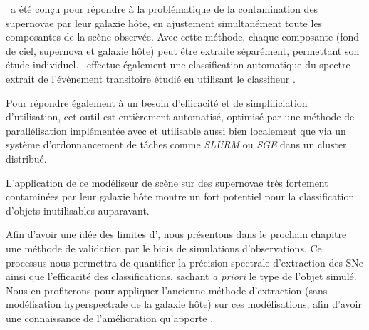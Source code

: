 \documentclass[../main/main.tex]{subfiles}
\begin{document}
\hypergal\ a été conçu pour répondre à la problématique de la
contamination des supernovae par leur galaxie hôte, en ajustement
simultanément toute les composantes de la scène observée. Avec cette
méthode, chaque composante (fond de ciel, supernova et galaxie hôte)
peut être extraite séparément, permettant son étude
individuel. \hypergal\ effectue également une classification automatique du
spectre extrait de l'évènement transitoire étudié en utilisant le
classifieur . 

Pour répondre également à un besoin d'efficacité et de simplificiation
d'utilisation, cet outil est entièrement
automatisé, optimisé par une méthode de parallélisation implémentée
avec  et utilisable aussi bien localement que via un système
d'ordonnancement de tâches comme \textit{SLURM} ou \textit{SGE} dans un
cluster distribué. 

L'application de ce modéliseur de scène sur des supernovae très
fortement contaminées par leur galaxie hôte montre un fort potentiel
pour la classification d'objets inutilisables auparavant.

Afin d'avoir une idée des limites d'\hypergal, nous présentons dans le
prochain chapitre une méthode de validation par le biais de simulations
d'observations. Ce processus nous permettra de quantifier la précision
spectrale d'extraction des SNe ainsi que l'efficacité des
classifications, sachant \textit{a priori} le type de l'objet
simulé. Nous en profiterons pour appliquer l'ancienne méthode
d'extraction (sans modélisation hyperspectrale de la galaxie hôte) sur
ces modélisations, afin d'avoir une connaissance de l'amélioration
qu'apporte \hypergal.


%
%
\end{document}

